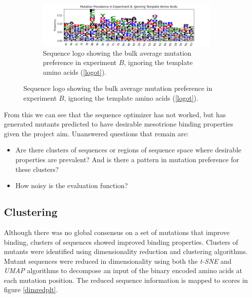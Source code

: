 \documentclass[16pt]{book}
\begin{document}
\begin{figure}
\begin{subfigure}{\textwidth}
\end{subfigure}
\begin{subfigure}{\textwidth}
	\includegraphics[width=\textwidth]{img/expb-logo-notemplate.png}
	\caption{\label{logonotpb} Sequence logo showing the bulk average mutation preference in experiment $B$, ignoring the template amino acids (\ref{logot}).}
\end{subfigure}
\end{figure}

From this we can see that the sequence optimizer has not worked, but has generated mutants predicted to have desirable mesotrione binding properties given the project aim.
Unanswered questions that remain are:
\begin{itemize}
	\item Are there clusters of sequences or regions of sequence space where desirable properties are prevalent? 
		And is there a pattern in mutation preference for these clusters?
	\item How noisy is the evaluation function?
\end{itemize}

\subsection{Clustering}

Although there was no global consensus on a set of mutations that improve binding, clusters of sequences showed improved binding properties.
Clusters of mutants were identified using dimensionality reduction and clustering algorithms.
Mutant sequences were reduced in dimensionality using both the \textit{t-SNE} \cite{van2008visualizing} and \textit{UMAP} \cite{mcinnes2018umap} algorithms to decompose an input of the binary encoded  amino acids at each mutation position.
The reduced sequence information is mapped to scores in figure \ref{dimredplt}.
\end{document}
